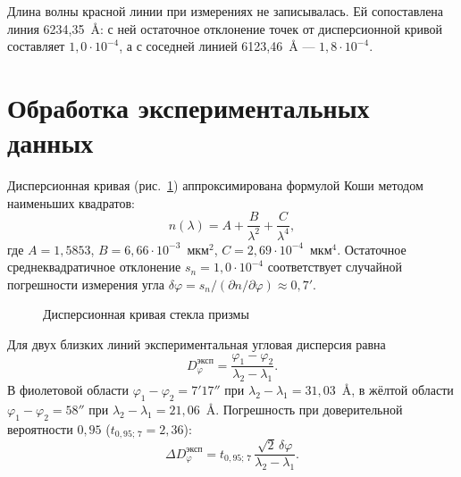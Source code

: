 \documentclass[14pt,a4paper]{extarticle}
\begin{document}
Длина волны красной линии при измерениях не записывалась. Ей сопоставлена линия 6234,35~\AA: с ней остаточное отклонение точек от дисперсионной кривой составляет $1{,}0\cdot 10^{-4}$, а с соседней линией 6123,46~\AA{} --- $1{,}8\cdot 10^{-4}$.

\section*{Обработка экспериментальных данных}

Дисперсионная кривая (рис.~\ref{fig:disp}) аппроксимирована формулой Коши методом наименьших квадратов:
\[
  n(\lambda) = A + \frac{B}{\lambda^2} + \frac{C}{\lambda^4},
\]
где $A = 1{,}5853$, $B = 6{,}66\cdot 10^{-3}$~мкм$^2$, $C = 2{,}69\cdot 10^{-4}$~мкм$^4$. Остаточное среднеквадратичное отклонение $s_n = 1{,}0\cdot 10^{-4}$ соответствует случайной погрешности измерения угла $\delta\varphi = s_n / (\partial n / \partial\varphi) \approx 0{,}7'$.

\begin{figure}[htbp]
\centering
{}
\caption{Дисперсионная кривая стекла призмы}
\label{fig:disp}
\end{figure}

Для двух близких линий экспериментальная угловая дисперсия равна
\[
  D_\varphi^{\text{эксп}} = \frac{\varphi_1 - \varphi_2}{\lambda_2 - \lambda_1}.
\]
В фиолетовой области $\varphi_1 - \varphi_2 = 7'17''$ при $\lambda_2 - \lambda_1 = 31{,}03$~\AA, в жёлтой области $\varphi_1 - \varphi_2 = 58''$ при $\lambda_2 - \lambda_1 = 21{,}06$~\AA. Погрешность при доверительной вероятности $0{,}95$ ($t_{0{,}95;\,7} = 2{,}36$):
\[
  \Delta D_\varphi^{\text{эксп}} = t_{0{,}95;\,7}\,\frac{\sqrt{2}\,\delta\varphi}{\lambda_2 - \lambda_1}.
\]
\end{document}
